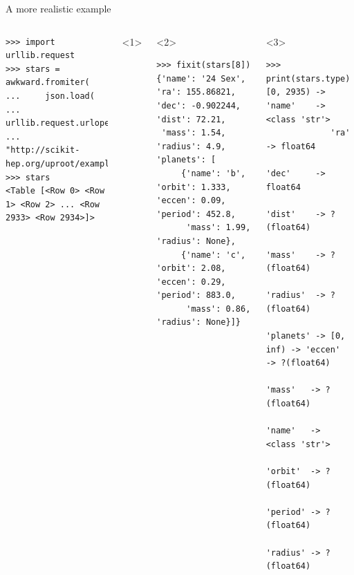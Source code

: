 \documentclass[aspectratio=169]{beamer}
\begin{document}
\begin{frame}[fragile]{A more realistic example}
\begin{columns}
\small
\begin{verbatim}
>>> import urllib.request
>>> stars = awkward.fromiter(
...     json.load(
...         urllib.request.urlopen(
...            "http://scikit-hep.org/uproot/examples/exoplanets.json")))
>>> stars
<Table [<Row 0> <Row 1> <Row 2> ... <Row 2933> <Row 2934>]>
\end{verbatim}

\begin{onlyenv}<1>
\vspace{10 cm}
\end{onlyenv}
\begin{onlyenv}<2>
\begin{verbatim}
>>> fixit(stars[8])
{'name': '24 Sex', 'ra': 155.86821, 'dec': -0.902244, 'dist': 72.21,
 'mass': 1.54, 'radius': 4.9, 'planets': [
     {'name': 'b', 'orbit': 1.333, 'eccen': 0.09, 'period': 452.8,
      'mass': 1.99, 'radius': None},
     {'name': 'c', 'orbit': 2.08, 'eccen': 0.29, 'period': 883.0,
      'mass': 0.86, 'radius': None}]}
\end{verbatim}

\vspace{10 cm}
\end{onlyenv}
\begin{onlyenv}<3>
\scriptsize
\vspace{-0.35 cm}
\begin{verbatim}
>>> print(stars.type)
[0, 2935) -> 'name'    -> <class 'str'>
             'ra'      -> float64
             'dec'     -> float64
             'dist'    -> ?(float64)
             'mass'    -> ?(float64)
             'radius'  -> ?(float64)
             'planets' -> [0, inf) -> 'eccen'  -> ?(float64)
                                      'mass'   -> ?(float64)
                                      'name'   -> <class 'str'>
                                      'orbit'  -> ?(float64)
                                      'period' -> ?(float64)
                                      'radius' -> ?(float64)
\end{verbatim}
\end{onlyenv}
\end{columns}
\end{frame}








\begin{frame}{}
\end{frame}
\end{document}
